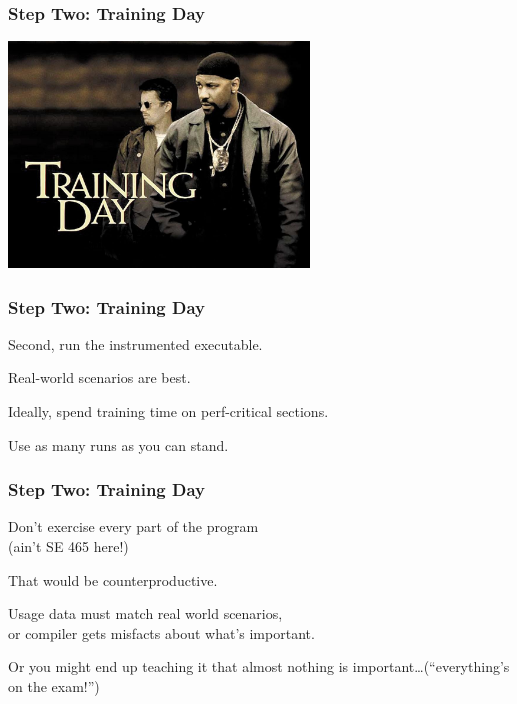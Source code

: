 \begin{frame}
\frametitle{Step Two: Training Day}

\begin{center}
	\includegraphics[width=0.6\textwidth]{images/training-day.jpg}
\end{center}

\end{frame}


\begin{frame}
\frametitle{Step Two: Training Day}
\large
\begin{changemargin}{2cm}

Second, run the instrumented executable.

Real-world scenarios are best.

Ideally, spend training time on perf-critical sections. 

Use as many runs as you can stand.
\end{changemargin}
\end{frame}



\begin{frame}
\frametitle{Step Two: Training Day}

\large
\begin{changemargin}{2cm}
Don't exercise every part of the program\\
(ain't SE 465 here!)

That would be counterproductive.

Usage data must match real world scenarios,\\
or compiler gets misfacts about what's important. 

Or you might end up teaching it that almost nothing
is important\ldots (``everything's on the exam!'')
\end{changemargin}

\end{frame}



